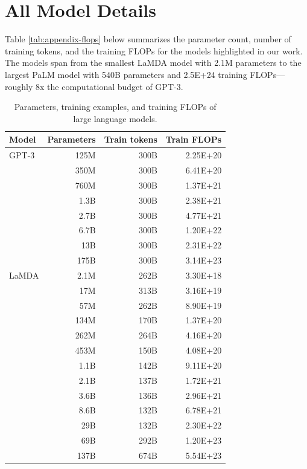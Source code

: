 \clearpage
\section{All Model Details}
Table \ref{tab:appendix-flops} below summarizes the parameter count, number of training tokens, and the training FLOPs for the models highlighted in our work.
The models span from the smallest LaMDA model with 2.1M parameters to the largest PaLM model with 540B parameters and 2.5E+24 training FLOPs---roughly 8x the computational budget of GPT-3.

\begingroup
\setlength{\tabcolsep}{4pt}
\begin{table}[!ht]
    \centering
    \small
    \caption{
    Parameters, training examples, and training FLOPs of large language models.
    }
    \begin{tabular}{lrrr}
    \toprule
        Model & Parameters & Train tokens &  Train FLOPs \\
        \midrule
        GPT-3 & 125M & 300B & 2.25E+20 \\
         & 350M	& 300B & 6.41E+20 \\
         & 760M & 300B & 1.37E+21 \\
         & 1.3B & 300B & 2.38E+21 \\
         & 2.7B & 300B & 4.77E+21 \\
         & 6.7B & 300B & 1.20E+22 \\
         & 13B & 300B & 2.31E+22 \\
         & 175B & 300B & 3.14E+23 \\
         \midrule
        LaMDA & 2.1M & 262B & 3.30E+18 \\
         & 17M & 313B & 3.16E+19 \\
         & 57M & 262B & 8.90E+19 \\
         & 134M & 170B	& 1.37E+20 \\
         & 262M & 264B	& 4.16E+20 \\
         & 453M & 150B & 4.08E+20 \\
         & 1.1B & 142B & 9.11E+20 \\
         & 2.1B & 137B & 1.72E+21 \\
         & 3.6B & 136B & 2.96E+21 \\
         & 8.6B & 132B & 6.78E+21 \\
         & 29B & 132B & 2.30E+22 \\
         & 69B & 292B & 1.20E+23 \\
         & 137B & 674B & 5.54E+23 \\

\end{tabular}
\end{table}
